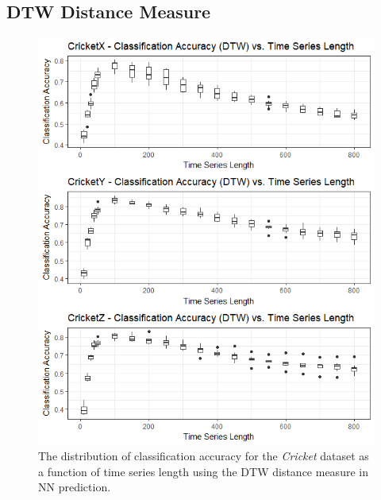 \documentclass[10pt,a4paper]{article}
\begin{document}
\subsection{DTW Distance Measure}

\begin{figure}[H]
\begin{center}
	\includegraphics[width=1\textwidth]{Images/CricketAccuracyVsLengthDTW_box.png}
	\caption{The distribution of classification accuracy for the \textit{Cricket} dataset as a function of time series length using the DTW distance measure in NN prediction.}
\end{center}
\end{figure}
\end{document}

